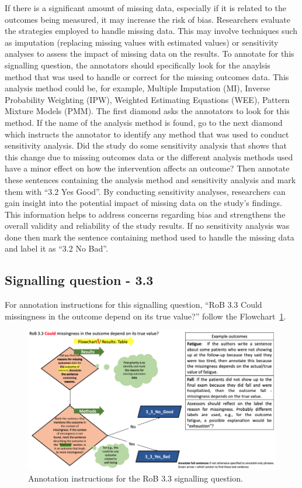 \documentclass[sn-mathphys,Numbered]{sn-jnl}%
\begin{document}
If there is a significant amount of missing data, especially if it is related to the outcomes being measured, it may increase the risk of bias.
Researchers evaluate the strategies employed to handle missing data.
This may involve techniques such as imputation (replacing missing values with estimated values) or sensitivity analyses to assess the impact of missing data on the results.
To annotate for this signalling question, the annotators should specifically look for the anaylsis method that was used to handle or correct for the missing outcomes data.
This analysis method could be, for example, Multiple Imputation (MI), Inverse Probability Weighting (IPW), Weighted Estimating Equations (WEE), Pattern Mixture Models (PMM).
The first diamond asks the annotators to look for this method.
If the name of the analysis method is found, go to the next diamond which instructs the annotator to identify any method that was used to conduct sensitivity analysis.
Did the study do some sensitivity analysis that shows that this change due to missing outcomes data or the different analysis methods used have a minor effect on how the intervention affects an outcome?
Then annotate these sentences containing the analysis method and sensitivity analysis and mark them with ``3.2 Yes Good''.
By conducting sensitivity analyses, researchers can gain insight into the potential impact of missing data on the study's findings. This information helps to address concerns regarding bias and strengthens the overall validity and reliability of the study results.
If no sensitivity analysis was done then mark the sentence containing method used to handle the missing data and label it as ``3.2 No Bad''.
%
%
%
\subsection*{Signalling question - 3.3 }
%
For annotation instructions for this signalling question, ``RoB 3.3 Could missingness in the outcome depend on its true value?'' follow the Flowchart~\ref{fig:3_3}.
%
\begin{figure}[hbt]
    \centering
    \includegraphics[width=\textwidth]{figures/3_3.png}
    \caption{Annotation instructions for the RoB 3.3 signalling question.}
    \label{fig:3_3}
\end{figure}
%
\end{document}
